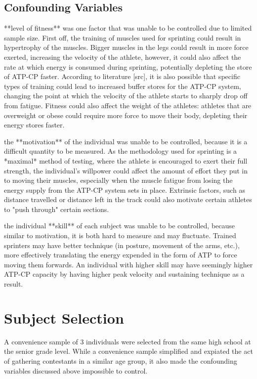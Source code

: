 \documentclass[index]{subfiles}
\begin{document}
\subsection{Confounding Variables}

**level of fitness** was one factor that was unable to be controlled due to limited sample size. First off, the training of muscles used for sprinting could result in hypertrophy of the muscles. Bigger muscles in the legs could result in more force exerted, increasing the velocity of the athlete, however, it could also affect the rate at which energy is consumed during sprinting, potentially depleting the store of ATP-CP faster. According to literature [src], it is also possible that specific types of training could lead to increased buffer stores for the ATP-CP system, changing the point at which the velocity of the athlete starts to sharply drop off from fatigue. Fitness could also affect the weight of the athletes: athletes that are overweight or obese could require more force to move their body, depleting their energy stores faster.

the **motivation** of the individual was unable to be controlled, because it is a difficult quantity to be measured. As the methodology used for sprinting is a *maximal* method of testing, where the athlete is encouraged to exert their full strength, the individual's willpower could affect the amount of effort they put in to moving their muscles, especially when the muscle fatigue from losing the energy supply from the ATP-CP system sets in place. Extrinsic factors, such as distance travelled or distance left in the track could also motivate certain athletes to "push through" certain sections.

the individual **skill** of each subject was unable to be controlled, because similar to motivation, it is both hard to measure and may fluctuate. Trained sprinters may have better technique (in posture, movement of the arms, etc.), more effectively translating the energy expended in the form of ATP to force moving them forwards. An individual with higher skill may have seemingly higher ATP-CP capacity by having higher peak velocity and sustaining technique as a result.

\section{Subject Selection}
A convenience sample of 3 individuals were selected from the same high school at the senior grade level. While a convenience sample simplified and expiated the act of gathering contestants in a similar age group, it also made the confounding variables discussed above impossible to control.
\end{document}
